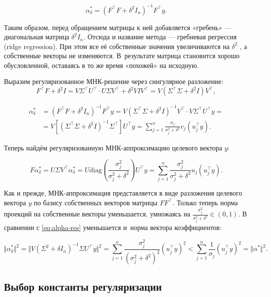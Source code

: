 \documentclass[11pt,a4paper]{article}
\begin{document}
\[ \alpha_\delta^\ast = (F^\top F + \delta^2 I_n)^{-1} F^\top y. \]

    Таким образом, перед обращением матрицы к ней добавляется «гребень» --- диагональная матрица \(\delta^2 I_n\).
Отсюда и название метода --- гребневая регрессия (ridge regression).
При этом все её собственные значения увеличиваются на \(\delta^2\) , а собственные векторы не изменяются.
В~результате матрица становится хорошо обусловленной, оставаясь в то же время «похожей» на исходную.

Выразим регуляризованное МНК-решение через сингулярное разложение:
\[ F^\top F + \delta^2 I = V\Sigma^\top U^\top \cdot U \Sigma V^\top + \delta^2 VIV^\top = V (\Sigma^\top \Sigma + \delta^2 I) V^\top, \]

\[
  \begin{aligned}
  \alpha_\delta^* &= (F^\top F + \delta^2 I_n)^{-1} F^\top y = V (\Sigma^\top \Sigma + \delta^2 I)^{-1} V^\top \cdot V \Sigma^\top U^\top y = \\
  &= V \left[ (\Sigma^\top \Sigma + \delta^2 I)^{-1} \Sigma^\top \right] U^\top y = \sum_{j=1}^n \frac{\sigma_j}{\sigma_j^2 + \delta^2} v_j (u_j^\top y).
  \end{aligned} \label{eq:alpha-tau-res}\tag{2}
\]

    Теперь найдём регуляризованную МНК-аппроксимацию целевого вектора \(y\):

\[ F\alpha_\delta^\ast = U \Sigma V^\top \alpha_\delta^* = U \mathrm{diag}\left( \frac{\sigma_j^2}{\sigma_j^2 + \delta^2} \right) U^\top y
= \sum_{j=1}^n \frac{\sigma_j^2}{\sigma_j^2 + \delta^2} u_j (u_j^\top y).  \label{eq:F-alpha-tau-res}\tag{3} \]

Как и прежде, МНК-аппроксимация представляется в виде разложения целевого вектора \(y\) по базису собственных векторов матрицы \(FF^\top\).
Только теперь норма проекций на собственные векторы уменьшается, умножаясь на \(\frac{\sigma_j^2}{\sigma_j^2 + \delta^2} \in (0, 1)\).
В сравнении с \eqref{eq:alpha-res} уменьшается и~норма вектора коэффициентов:

\[ \Vert \alpha_\delta^{\ast} \Vert^2 = \Vert V(\Sigma^2 + \delta I_n)^{-1} \Sigma U^\top y \Vert^2
= \sum_{j=1}^n \frac{\sigma_j^2}{(\sigma_j^2 + \delta^2)^2} (u_j^\top y)^2 < \sum_{j=1}^n \frac{1}{\sigma_j} (u_j^\top y)^2
= \Vert \alpha^{\ast} \Vert^2. \label{eq:alpha-tau-es-norm}\tag{4} \]

    \hypertarget{ux432ux44bux431ux43eux440-ux43aux43eux43dux441ux442ux430ux43dux442ux44b-ux440ux435ux433ux443ux43bux44fux440ux438ux437ux430ux446ux438ux438}{%
\subsection{Выбор константы
регуляризации}\label{ux432ux44bux431ux43eux440-ux43aux43eux43dux441ux442ux430ux43dux442ux44b-ux440ux435ux433ux443ux43bux44fux440ux438ux437ux430ux446ux438ux438}}
\end{document}
